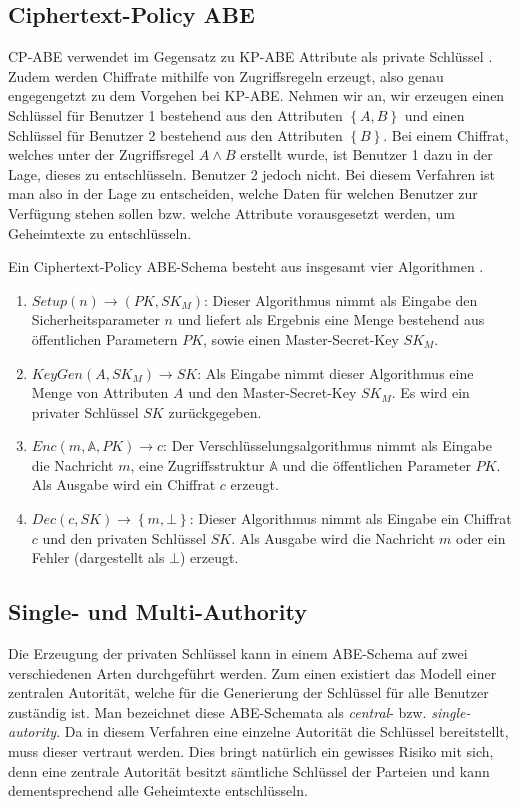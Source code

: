 \subsection{Ciphertext-Policy ABE}
CP-ABE verwendet im Gegensatz zu KP-ABE Attribute als private Schlüssel
\cite{cp-abe-ieee}. Zudem werden Chiffrate mithilfe von Zugriffsregeln
erzeugt, also genau engegengetzt zu dem Vorgehen bei KP-ABE. Nehmen wir an,
wir erzeugen einen Schlüssel für Benutzer 1 bestehend aus den Attributen
$\left\{A, B\right\}$ und einen Schlüssel für Benutzer 2 bestehend aus den
Attributen $\left\{B\right\}$. Bei einem Chiffrat, welches unter der
Zugriffsregel $A \land B$ erstellt wurde, ist Benutzer 1 dazu in der Lage,
dieses zu entschlüsseln.  Benutzer 2 jedoch nicht. Bei diesem Verfahren ist
man also in der Lage zu entscheiden, welche Daten für welchen Benutzer zur
Verfügung stehen sollen bzw. welche Attribute vorausgesetzt werden, um Geheimtexte
zu entschlüsseln.

Ein Ciphertext-Policy ABE-Schema besteht aus insgesamt vier Algorithmen
\cite{cp-abe}.

\begin{enumerate}
	\item $\textit{Setup}\left(n\right) \to \left(PK, SK_M\right)$: Dieser
		Algorithmus nimmt als Eingabe den Sicherheitsparameter $n$ und liefert als
		Ergebnis eine Menge bestehend aus öffentlichen Parametern $PK$, sowie
		einen Master-Secret-Key $SK_M$.
	\item $\textit{KeyGen}\left(A, SK_M\right) \to SK$: Als Eingabe
		nimmt dieser Algorithmus eine Menge von Attributen $A$ und den
		Master-Secret-Key $SK_M$. Es wird ein privater Schlüssel $SK$
		zurückgegeben.
	\item $Enc\left(m, \mathbb{A}, PK\right) \to c$: Der
		Verschlüsselungsalgorithmus nimmt als Eingabe die Nachricht $m$, eine
		Zugriffsstruktur $\mathbb{A}$ und die öffentlichen Parameter $PK$.  Als
		Ausgabe wird ein Chiffrat $c$ erzeugt.
	\item $Dec\left(c, SK\right) \to \left\{m, \bot\right\}$: Dieser Algorithmus
		nimmt als Eingabe ein Chiffrat $c$ und den privaten Schlüssel $SK$. Als
		Ausgabe wird die Nachricht $m$ oder ein Fehler (dargestellt als $\bot$)
		erzeugt.
\end{enumerate}

\subsection{Single- und Multi-Authority}
Die Erzeugung der privaten Schlüssel kann in einem ABE-Schema auf zwei
verschiedenen Arten durchgeführt werden. Zum einen existiert das Modell einer
zentralen Autorität, welche für die Generierung der Schlüssel für alle
Benutzer zuständig ist. Man bezeichnet diese ABE-Schemata als
\textit{central}- bzw. \textit{single-autority}. Da in diesem Verfahren eine
einzelne Autorität die Schlüssel bereitstellt, muss dieser vertraut werden.
Dies bringt natürlich ein gewisses Risiko mit sich, denn eine zentrale
Autorität besitzt sämtliche Schlüssel der Parteien und kann dementsprechend
alle Geheimtexte entschlüsseln.

